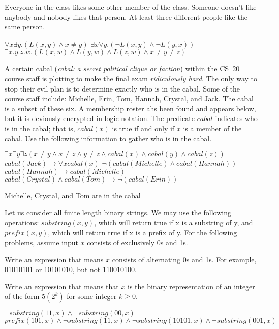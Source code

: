 \documentclass[solution, letterpaper]{cs20inclass}
\begin{document}
\subproblem Everyone in the class likes some other member of the class.
\subproblem Someone doesn't like anybody and nobody likes that person.
\subproblem At least three different people like the same person.

\begin{solution}

\subsolution $\forall x \exists y . (L(x,y) \wedge x \neq y)$
\subsolution $\exists x \forall y . (\lnot L(x,y) \wedge \lnot L(y,x))$
\subsolution $\exists x. y. z. w. (L(x,w) \land L(y,w) \land L(z,w) \land x \neq y \neq z)$

\end{solution}

\problem A certain cabal (\emph{cabal: a secret political clique or faction})
 within the CS~20 course staff is
plotting to make the final exam \emph{ridiculously hard}. The only way to stop their evil plan is to determine exactly who is in the cabal. Some of the course staff include: Michelle, Erin, Tom, Hannah, Crystal, and Jack. The cabal is a subset of these six. A membership roster ahs been found and appears below, but it is deviously encrypted in logic notation. The predicate $cabal$ indicates who is in the cabal; that is, $cabal(x)$ is true if and only if $x$ is a member of the cabal. Use the following information to gather who is in the cabal. 

\subproblem $\exists x \exists y \exists z (x \neq y \land x \neq z \land y \neq z \land cabal(x) \land cabal(y) \land cabal(z))$
\subproblem $cabal(Jack) \rightarrow \forall x cabal(x)$
\subproblem $\lnot (cabal(Michelle) \land cabal(Hannah))$
\subproblem $cabal(Hannah) \rightarrow cabal(Michelle)$
\subproblem $cabal(Crystal) \land cabal(Tom) \rightarrow \lnot(cabal(Erin))$

\begin{solution}
Michelle, Crystal, and Tom are in the cabal
\end{solution}

\problem Let us consider all finite length binary strings. We may use the following operations: $substring(x,y)$, which will return true if x is a substring of y, and $prefix(x,y)$, which will return true if x is a prefix of y. For the following problems, assume input $x$ consists of exclusively 0s and 1s. 

\subproblem Write an expression that means $x$ consists of alternating 0s and 1s. For example, 01010101 or 10101010, but not 110010100. 

\subproblem Write an expression that means that $x$ is the binary representation of an integer of the form $5(2^k)$ for some integer $k \geq 0$. 

\begin{solution}
\subsolution $\lnot substring(11, x) \land \lnot substring(00,x)$
\subsolution $ prefix(101, x) \land \lnot substring(11, x) \land \lnot substring(10101, x) \land \lnot substring(001,x)$

\end{solution}
\end{document}
